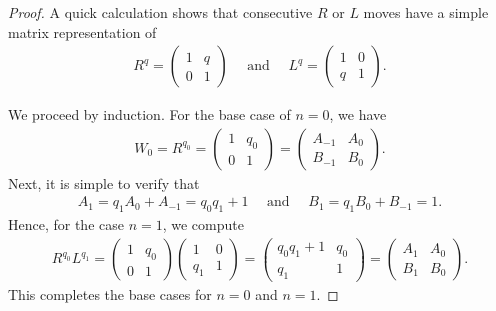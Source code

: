 \documentclass[10pt,a4paper]{amsart}
\begin{document}
\begin{proof} A quick calculation shows that consecutive $ R $ or $ L $ moves have a simple matrix representation of
\begin{align*}
	R^q = \begin{pmatrix} 1 & q \\ 0 & 1 \end{pmatrix} \quad \text{ and } \quad L^q = \begin{pmatrix} 1 & 0 \\ q & 1 \end{pmatrix}.
\end{align*}

We proceed by induction. For the base case of $ n = 0 $, we have
\begin{align*}
	W_0 = R^{q_0} = \begin{pmatrix} 1 & q_0 \\ 0 & 1 \end{pmatrix} = \begin{pmatrix} A_{-1} & A_0 \\ B_{-1} & B_0 \end{pmatrix}.
\end{align*}
Next, it is simple to verify that
\begin{align*}
	A_1 = q_1 A_0 + A_{-1} = q_0 q_1 + 1 \quad \text{ and } \quad B_1 = q_1 B_0 + B_{-1} = 1.
\end{align*}
Hence, for the case $ n = 1 $, we compute
\begin{align*}
	R^{q_0} L^{q_1} = \begin{pmatrix} 1 & q_0 \\ 0 & 1 \end{pmatrix} \begin{pmatrix} 1 & 0 \\ q_1 & 1 \end{pmatrix} = \begin{pmatrix} q_0 q_1 + 1 & q_0 \\ q_1 & 1 \end{pmatrix} = \begin{pmatrix} A_1 & A_0 \\ B_1 & B_0 \end{pmatrix}.
\end{align*}
This completes the base cases for $ n = 0 $ and $ n = 1 $.


\end{proof}
\end{document}
